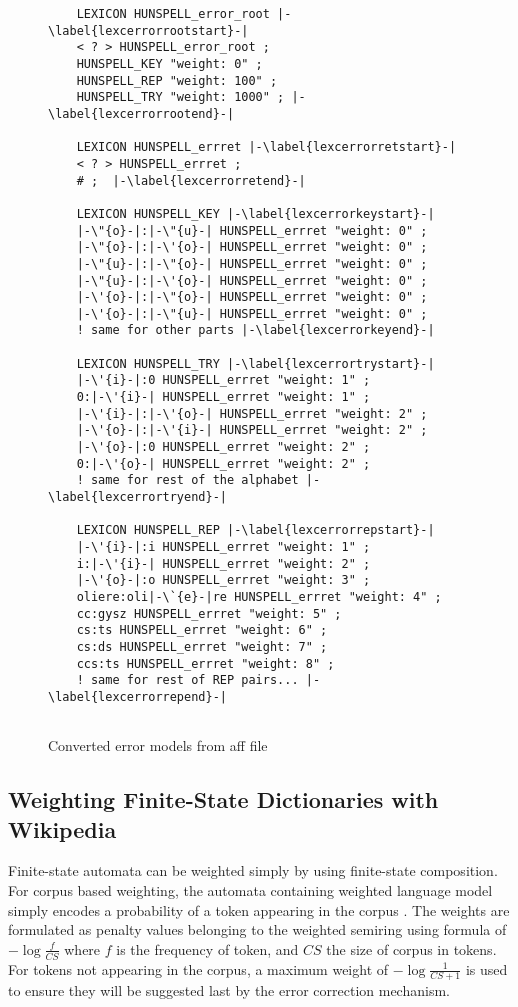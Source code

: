 \documentclass[postprint]{flammie}
\begin{document}
\begin{figure}[tbp]
  \centering
  \begin{lstlisting}
    LEXICON HUNSPELL_error_root |-\label{lexcerrorrootstart}-|
    < ? > HUNSPELL_error_root ; 
    HUNSPELL_KEY "weight: 0" ;
    HUNSPELL_REP "weight: 100" ;
    HUNSPELL_TRY "weight: 1000" ; |-\label{lexcerrorrootend}-|
    
    LEXICON HUNSPELL_errret |-\label{lexcerrorretstart}-|
    < ? > HUNSPELL_errret ; 
    # ;  |-\label{lexcerrorretend}-|
    
    LEXICON HUNSPELL_KEY |-\label{lexcerrorkeystart}-|
    |-\"{o}-|:|-\"{u}-| HUNSPELL_errret "weight: 0" ; 
    |-\"{o}-|:|-\'{o}-| HUNSPELL_errret "weight: 0" ;
    |-\"{u}-|:|-\"{o}-| HUNSPELL_errret "weight: 0" ;
    |-\"{u}-|:|-\'{o}-| HUNSPELL_errret "weight: 0" ;
    |-\'{o}-|:|-\"{o}-| HUNSPELL_errret "weight: 0" ;
    |-\'{o}-|:|-\"{u}-| HUNSPELL_errret "weight: 0" ; 
    ! same for other parts |-\label{lexcerrorkeyend}-|
    
    LEXICON HUNSPELL_TRY |-\label{lexcerrortrystart}-|
    |-\'{i}-|:0 HUNSPELL_errret "weight: 1" ;
    0:|-\'{i}-| HUNSPELL_errret "weight: 1" ;
    |-\'{i}-|:|-\'{o}-| HUNSPELL_errret "weight: 2" ;
    |-\'{o}-|:|-\'{i}-| HUNSPELL_errret "weight: 2" ;
    |-\'{o}-|:0 HUNSPELL_errret "weight: 2" ;
    0:|-\'{o}-| HUNSPELL_errret "weight: 2" ;
    ! same for rest of the alphabet |-\label{lexcerrortryend}-|
    
    LEXICON HUNSPELL_REP |-\label{lexcerrorrepstart}-|
    |-\'{i}-|:i HUNSPELL_errret "weight: 1" ;
    i:|-\'{i}-| HUNSPELL_errret "weight: 2" ;
    |-\'{o}-|:o HUNSPELL_errret "weight: 3" ;       
    oliere:oli|-\`{e}-|re HUNSPELL_errret "weight: 4" ; 
    cc:gysz HUNSPELL_errret "weight: 5" ;       
    cs:ts HUNSPELL_errret "weight: 6" ;       
    cs:ds HUNSPELL_errret "weight: 7" ;       
    ccs:ts HUNSPELL_errret "weight: 8" ;  
    ! same for rest of REP pairs... |-\label{lexcerrorrepend}-|
    
  \end{lstlisting}
  \caption{Converted error models from aff file}
  \label{fig:lexc-error-models}
\end{figure}

\subsection{Weighting Finite-State Dictionaries with Wikipedia}

Finite-state automata can be weighted simply by using finite-state composition.
For corpus based weighting, the automata containing weighted language model
simply encodes a probability of a token appearing in the corpus \cite{pirinen2010finitestate}.
The weights are formulated as penalty values belonging to the weighted semiring
using formula of $-\log\frac{f}{CS}$ where $f$ is the frequency of token, and
$CS$ the size of corpus in tokens. For tokens not appearing in the corpus, a
maximum weight of $-\log\frac{1}{CS+1}$ is used to ensure they will be suggested
last by the error correction mechanism.
\end{document}
